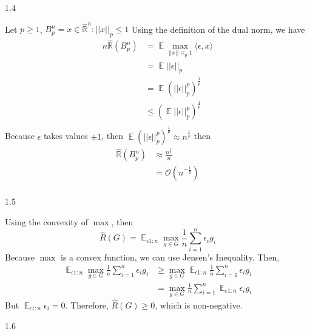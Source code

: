 \documentclass[12pt]{report}
\begin{document}
1.4

Let $p \geq 1$, $B^{n}_{p} = {x \in \mathbb{\hat{R}}^{n} : \lvert \lvert x \rvert \rvert_{p} \leq 1} $
Using the definition of the dual norm, we have
\begin{equation}
  \begin{aligned}
    n \mathbb{\hat{R}}(B^{n}_{p}) & = \mathop{\mathbb{E}} \max_{\lvert \lvert x \rvert \rvert \leq_{p} 1}\langle \epsilon,x \rangle \\
    & = \mathop{\mathbb{E}}\lvert \lvert \epsilon \rvert \rvert_{p} \\
    & = \mathop{\mathbb{E}}(\lvert \lvert \epsilon \rvert \rvert_{p}^{p})^{\frac{1}{p}} \\
    & \leq (\mathop{\mathbb{E}}\lvert \lvert \epsilon \rvert \rvert_{p}^{p})^{\frac{1}{p}} \\
  \end{aligned}
\end{equation}
Because $\epsilon$ takes values $\pm 1$, then $\mathop{\mathbb{E}}(\lvert \lvert \epsilon \rvert \rvert_{p}^{p})^{\frac{1}{p}} \approx  n^{\frac{1}{p}}$ then
\begin{equation}
  \begin{aligned}
    \mathbb{\hat{R}}(B^{n}_{p}) & \approx \frac{n^{\frac{1}{p}}}{n} \\
    & = \mathcal{O}(n^{-\frac{1}{p}}) \\
  \end{aligned}
\end{equation}

1.5

Using the convexity of $\max$, then
$$ \hat{R}(G) = \mathop{\mathbb{E}}_{\epsilon1:n} \max_{g \in G} \frac{1}{n} \sum^{n}_{i=1}\epsilon_{i}g_{i}$$
Because $\max$ is a convex function, we can use Jensen's Inequality. Then,
\begin{equation}
  \begin{aligned}
    \mathop{\mathbb{E}}_{\epsilon1:n} \max_{g \in G} \frac{1}{n} \sum^{n}_{i=1} \epsilon_{i}g_{i} & \geq \max_{g \in G} \mathop{\mathbb{E}}_{\epsilon1:n} \frac{1}{n} \sum^{n}_{i=1} \epsilon_{i}g_{i} \\
    & = \max_{g \in G} \frac{1}{n} \sum^{n}_{i=1} \mathop{\mathbb{E}}_{\epsilon1:n}\epsilon_{i}g_{i}
  \end{aligned}
\end{equation}
But $\mathop{\mathbb{E}}_{\epsilon1:n}\epsilon_{i} = 0$. Therefore, $\hat{R}(G) \geq 0$, which is non-negative.

1.6
\end{document}
